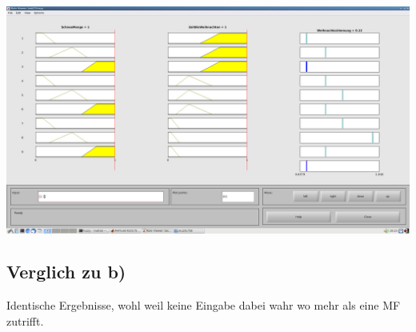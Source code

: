 \includegraphics[width=\textwidth]{part/screenshots/fuzzy-17d-1-1}

\subsection*{Verglich zu b)}

Identische Ergebnisse, wohl weil keine Eingabe dabei wahr wo mehr als eine MF zutrifft.